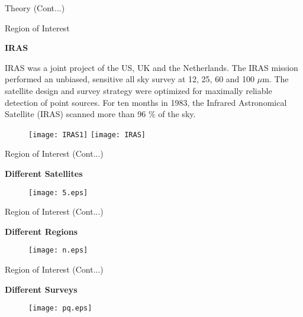 \documentclass[12pt,a4paper]{beamer}
\begin{document}
\begin{frame}{Theory (Cont...)}
\begin{frame}
\begin{center}
\Large\bf\color{red}{Region of Interest}
\end{center}
\end{frame}

\begin{frame}{Region of Interest}
\begin{block}{\centering\textbf{IRAS \cite{32,33} \vspace*{.5cm}}}
\begin{itemize}
IRAS was a joint project of the US, UK and the Netherlands. The
IRAS mission performed an unbiased, sensitive all sky survey at
12, 25, 60 and 100 $\mu$m. The satellite design and survey
strategy were optimized for maximally reliable detection of point
sources. For ten months in 1983, the Infrared Astronomical
Satellite (IRAS) scanned more than 96 $\%$ of the sky.
 \begin{figure}[h]
\vspace{0.0cm} \centering
\texttt{[image: IRAS1]}
\texttt{[image: IRAS]}
\end{figure}
\end{itemize}
\end{block}
\end{frame}
\begin{frame}{Region of Interest (Cont...)}
\begin{block}{\centering\textbf{Different Satellites \vspace*{.5cm}}}
\begin{figure}[h]
\vspace{0.0cm} \centering
\texttt{[image: 5.eps]}
\end{figure}
\end{block}
\end{frame}

\begin{frame}{Region of Interest (Cont...)}
\begin{block}{\centering\textbf{Different Regions \vspace*{.5cm}}}
\begin{figure}[h]
\vspace{0.0cm} \centering
\texttt{[image: n.eps]}
\end{figure}
\end{block}
\end{frame}

\begin{frame}{Region of Interest (Cont...)}
\begin{block}{\centering\textbf{Different Surveys \vspace*{.5cm}}}
\begin{figure}[h]
\vspace{0.0cm} \centering
\texttt{[image: pq.eps]}
\end{figure}
\end{block}
\end{frame}


\end{frame}
\end{document}
